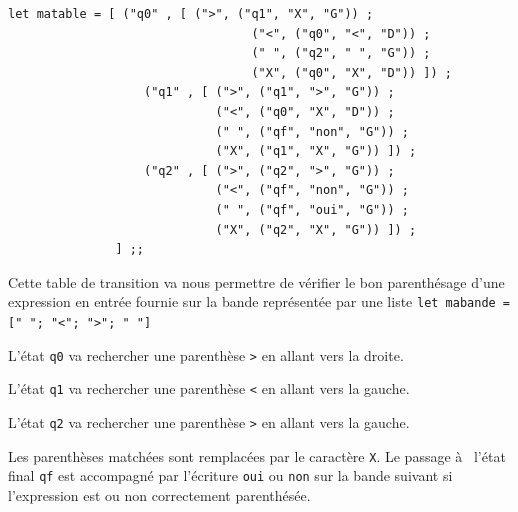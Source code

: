 \documentclass[11pt]{book}
\begin{document}
\begin{Verbatim}
let matable = [ ("q0" , [ (">", ("q1", "X", "G")) ;
								  ("<", ("q0", "<", "D")) ; 
								  (" ", ("q2", " ", "G")) ;
								  ("X", ("q0", "X",	"D")) ]) ;
			       ("q1" , [ (">", ("q1", ">", "G")) ;
			                 ("<", ("q0", "X", "D")) ;
			                 (" ", ("qf", "non", "G")) ;
			                 ("X", ("q1", "X", "G")) ]) ;
			       ("q2" , [ (">", ("q2", ">", "G")) ;
			                 ("<", ("qf", "non", "G")) ;
			                 (" ", ("qf", "oui", "G")) ;
			                 ("X", ("q2", "X", "G")) ]) ;
			   ] ;;
\end{Verbatim}

Cette table de transition va nous permettre de vérifier le bon parenthésage
d'une expression en entrée fournie sur la bande représentée par une liste 
\verb+let mabande =   [" "; "<"; ">"; " "]+

L'état \verb+q0+ va rechercher une parenthèse \verb+>+ en allant vers la droite.

L'état \verb+q1+ va rechercher une parenthèse \verb+<+ en allant vers la gauche.

L'état \verb+q2+ va rechercher une parenthèse \verb+>+ en allant vers la gauche.


Les parenthèses matchées sont remplacées par le caractère \verb+X+.
Le passage à  l'état final \verb+qf+ est accompagné par l'écriture \verb+oui+ ou
\verb+non+ sur la bande suivant si l'expression est ou non correctement parenthésée.
\end{document}
